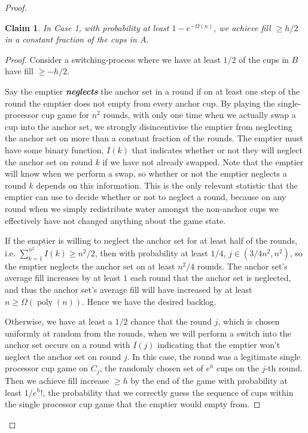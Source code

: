 \documentclass[twocolumn]{article}[11pt]
\newcommand{\defn}[1]{{\textit{\textbf{\boldmath #1}}}}
\DeclareMathOperator{\poly}{\text{poly}}
\newtheorem{clm}{Claim}
\begin{document}
\begin{proof}
\begin{clm}
  \label{clm:reg} In Case 1, with probability at least $1-e^{-\Omega(n)}$, we
  achieve fill $\ge h/2$ in a constant fraction of the cups in $A$.
\end{clm}
\begin{proof}
  Consider a switching-process where we have at least $1/2$ of the cups in $B$
  have fill $\ge -h/2$.

  Say the emptier \defn{neglects} the anchor set in a round if on at least one
  step of the round the emptier does not empty from every anchor cup. By
  playing the single-processor cup game for $n^2$ rounds, with only one time
  when we actually swap a cup into the anchor set, we strongly disincentivise
  the emptier from neglecting the anchor set on more than a constant fraction
  of the rounds. 
  The emptier must have some binary function, $I(k)$ that indicates whether or
  not they will neglect the anchor set on round $k$ if we have not already
  swapped. Note that the emptier will know when we perform a swap, so whether
  or not the emptier neglects a round $k$ depends on this information. This is
  the only relevant statistic that the emptier can use to decide whether or not
  to neglect a round, because on any round when we simply redistribute water
  amongst the non-anchor cups we effectively have not changed anything about
  the game state.

  If the emptier is willing to neglect the anchor set for at least half of the
  rounds, i.e. $\sum_{k=1}^{n^2} I(k) \ge n^2 / 2$, then with probability at
  least $1/4$, $j \in (3/4 n^2, n^2)$, so the emptier neglects the anchor set
  on at least $n^2/4$ rounds. The anchor set's average fill increases by at
  least $1$ each round that the anchor set is neglected, and thus the anchor
  set's average fill will have increased by at least $n \ge \Omega(\poly(n))$.
  Hence we have the desired backlog.

  Otherwise, we have at least a $1/2$ chance that the round $j$, which is
  chosen uniformly at random from the rounds, when we will perform a switch
  into the anchor set occurs on a round with $I(j)$ indicating that the emptier
  won't neglect the anchor set on round $j$. In this case, the round was a
  legitimate single processor cup game on $C_j$, the randomly chosen set of
  $e^h$ cups on the $j$-th round. Then we achieve fill increase $\ge h$ by the
  end of the game with probability at least $1/e^h!$, the probability that we
  correctly guess the sequence of cups within the single processor cup game
  that the emptier would empty from. 


\end{proof}
\end{proof}
\end{document}
